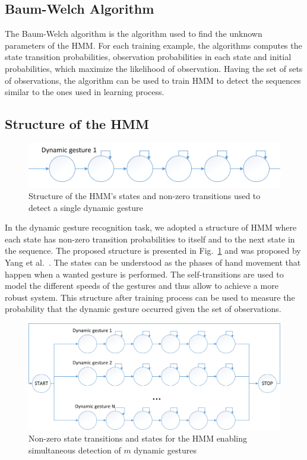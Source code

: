 \subsection{Baum-Welch Algorithm}

The Baum-Welch algorithm is the algorithm used to find the unknown parameters of the HMM.
For each training example, the algorithms computes the state transition probabilities, observation probabilities in each state and initial probabilities, which maximize the likelihood of observation.
Having the set of sets of observations, the algorithm can be used to train HMM to detect the sequences similar to the ones used in learning process.

\subsection{Structure of the HMM}

\begin{figure}[htb]
\centering
 \includegraphics[width=1\columnwidth]{figures/SingleHMM.png}
 \caption{Structure of the HMM's states and non-zero transitions used to detect a single dynamic gesture}
 \label{singlehmm}
\end{figure}

In the dynamic gesture recognition task, we adopted a structure of HMM where each state has non-zero transition probabilities to itself and to the next state in the sequence.
The proposed structure is presented in Fig.~\ref{singlehmm} and was proposed by Yang et al.~\cite{hmm}.
The states can be understood as the phases of hand movement that happen when a wanted gesture is performed.
The self-transitions are used to model the different speeds of the gestures and thus allow to achieve a more robust system.
This structure after training process can be used to measure the probability that the dynamic gesture occurred given the set of observations.

\begin{figure}[htb]
\centering
 \includegraphics[width=1\columnwidth]{figures/HMM_eng.png}
 \caption{Non-zero state transitions and states for the HMM enabling simultaneous detection of $m$ dynamic gestures}
 \label{HMMstructure}
\end{figure}

